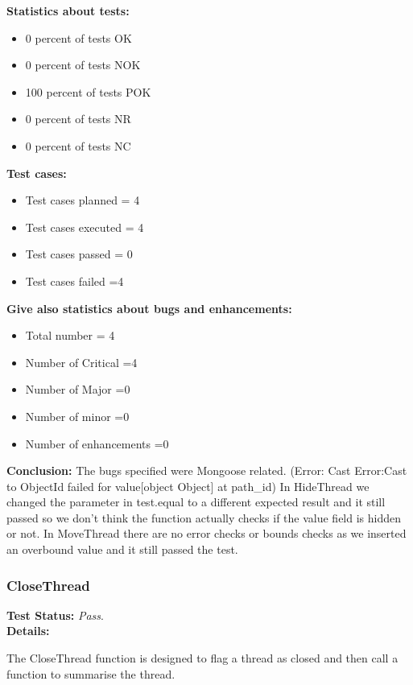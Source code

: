 \begin{flushleft}
\begin{flushleft}
\textbf{Statistics about tests:}
\begin{itemize}
  \item 	0 percent of tests OK
  \item  0 percent of tests NOK
   \item 100 percent of tests POK
    \item 	0 percent of tests NR
        \item 	0 percent of tests NC
 \end{itemize}

\textbf{Test cases:}
\begin{itemize}
  \item Test cases planned = 4 
  \item  Test cases executed = 4
   \item Test cases passed = 0
    \item Test cases failed =4
 \end{itemize}

\textbf{Give also statistics about bugs and enhancements:}
\begin{itemize}
  \item 	Total number = 4
  \item  	Number of Critical =4
   \item 	Number of Major =0
    \item Number of minor =0
      \item Number of enhancements =0
 \end{itemize}

\textbf{Conclusion:}
The bugs specified were Mongoose related. (Error: Cast Error:Cast to ObjectId failed for value[object Object] at path_id)
In HideThread we changed the parameter in test.equal to a different expected result and it still passed so we don’t think the function actually checks if the value field is hidden or not.
In MoveThread there are no error checks or bounds checks as we inserted an overbound value and it still passed the test. 

\end{flushleft}

\subsubsection{CloseThread}
\begin{flushleft}
\textbf{Test Status:} \emph{Pass}. \\

\textbf{Details:}

The CloseThread function is designed to flag a thread as closed and then call a function to summarise the thread.\\


\end{flushleft}
\end{flushleft}
